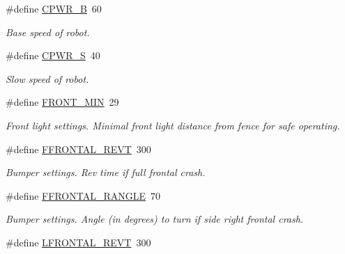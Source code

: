 \begin{DoxyCompactItemize}
\item 
\hypertarget{reactor_8nxc_a738b9657b067e383cd066d4c7ca6f576}{
\#define \hyperlink{reactor_8nxc_a738b9657b067e383cd066d4c7ca6f576}{CPWR\_\-B}~60}
\label{reactor_8nxc_a738b9657b067e383cd066d4c7ca6f576}

\begin{DoxyCompactList}\small\item\em Base speed of robot. \item\end{DoxyCompactList}\item 
\hypertarget{reactor_8nxc_ae382ea7d9a3437076c5616056836377a}{
\#define \hyperlink{reactor_8nxc_ae382ea7d9a3437076c5616056836377a}{CPWR\_\-S}~40}
\label{reactor_8nxc_ae382ea7d9a3437076c5616056836377a}

\begin{DoxyCompactList}\small\item\em Slow speed of robot. \item\end{DoxyCompactList}\item 
\hypertarget{reactor_8nxc_ac9341f36c8b85c8d70f06973c2d9a5bd}{
\#define \hyperlink{reactor_8nxc_ac9341f36c8b85c8d70f06973c2d9a5bd}{FRONT\_\-MIN}~29}
\label{reactor_8nxc_ac9341f36c8b85c8d70f06973c2d9a5bd}

\begin{DoxyCompactList}\small\item\em Front light settings. Minimal front light distance from fence for safe operating. \item\end{DoxyCompactList}\item 
\hypertarget{reactor_8nxc_acb1164349a1fa4b7052e28f7c7c735d4}{
\#define \hyperlink{reactor_8nxc_acb1164349a1fa4b7052e28f7c7c735d4}{FFRONTAL\_\-REVT}~300}
\label{reactor_8nxc_acb1164349a1fa4b7052e28f7c7c735d4}

\begin{DoxyCompactList}\small\item\em Bumper settings. Rev time if full frontal crash. \item\end{DoxyCompactList}\item 
\hypertarget{reactor_8nxc_abda398fa4722b8691dc8c52c733a2814}{
\#define \hyperlink{reactor_8nxc_abda398fa4722b8691dc8c52c733a2814}{FFRONTAL\_\-RANGLE}~70}
\label{reactor_8nxc_abda398fa4722b8691dc8c52c733a2814}

\begin{DoxyCompactList}\small\item\em Bumper settings. Angle (in degrees) to turn if side right frontal crash. \item\end{DoxyCompactList}\item 
\hypertarget{reactor_8nxc_aac0491bc7a39228e57b85de235ef59eb}{
\#define \hyperlink{reactor_8nxc_aac0491bc7a39228e57b85de235ef59eb}{LFRONTAL\_\-REVT}~300}
\label{reactor_8nxc_aac0491bc7a39228e57b85de235ef59eb}


\end{DoxyCompactItemize}
